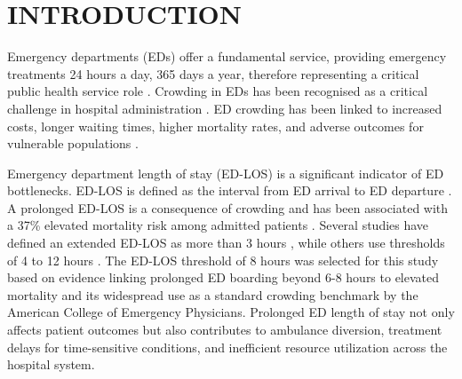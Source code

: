 \documentclass[harvard,article]{frontiersinFPHY_FAMS}
\begin{document}
\begin{abstract}
\noindent\textbf{Conclusion:} ML using data at or before the time of triage shows strong discrimination for hospital admission and modest discrimination for predicting ED-LOS and prolonged hospital LOS. SHAP analysis provides interpretable feature importance to support clinical decision-making. Decision curve analysis demonstrated strong clinical utility for hospital admission prediction and modest utility for ED-LOS and hospital LOS prediction. External validation and probability recalibration are required before clinical deployment.

\noindent\textbf{Keywords:} machine learning, emergency department, hospital admission, length of stay, Shapley Additive Explanations, decision curve analysis

\end{abstract}

\section{INTRODUCTION}

Emergency departments (EDs) offer a fundamental service, providing emergency treatments 24 hours a day, 365 days a year, therefore representing a critical public health service role \cite{higginson2012, trzeciak2003, ricciardi2024}. Crowding in EDs has been recognised as a critical challenge in hospital administration \cite{asplin2003, rcem2025}. ED crowding has been linked to increased costs, longer waiting times, higher mortality rates, and adverse outcomes for vulnerable populations \cite{sun2013, burke2020, obermeyer2019}.

Emergency department length of stay (ED-LOS) is a significant indicator of ED bottlenecks. ED-LOS is defined as the interval from ED arrival to ED departure \cite{stone2022, ricciardi2024}. A prolonged ED-LOS is a consequence of crowding and has been associated with a 37\% elevated mortality risk among admitted patients \cite{sun2013}. Several studies have defined an extended ED-LOS as more than 3 hours \cite{ricciardi2024}, while others use thresholds of 4 to 12 hours \cite{farimani2024}. The ED-LOS threshold of 8 hours was selected for this study based on evidence linking prolonged ED boarding beyond 6-8 hours to elevated mortality \cite{sun2013} and its widespread use as a standard crowding benchmark by the American College of Emergency Physicians. Prolonged ED length of stay not only affects patient outcomes but also contributes to ambulance diversion, treatment delays for time-sensitive conditions, and inefficient resource utilization across the hospital system.
\end{document}
